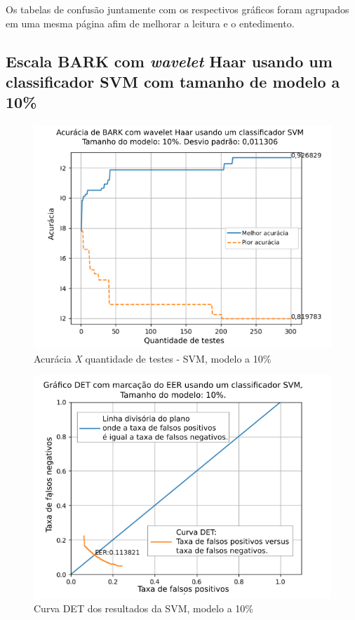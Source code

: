 		
		
		\par Os tabelas de confusão juntamente com os respectivos gráficos foram agrupados em uma mesma página afim de melhorar a leitura e o entedimento.
		
		\newpage
		\subsection{Escala BARK com \textit{wavelet} Haar usando um classificador SVM com tamanho de modelo a 10\%}
			
		
			\begin{figure}[H]
				\centering
				\includegraphics[width=.6\linewidth]{images/results/confusionMatrices/classifier_SVM_10.png}
				\caption{Acurácia \textit{X} quantidade de testes - SVM, modelo a 10\%}
				\label{fig:classifiersvm10}
			\end{figure}
		
			\begin{figure}[H]
				\centering
				\includegraphics[width=.6\linewidth]{images/results/det/DET_SVM_10}
				\caption{Curva DET dos resultados da SVM, modelo a 10\%}
				\label{fig:detsvm10}
			\end{figure}

